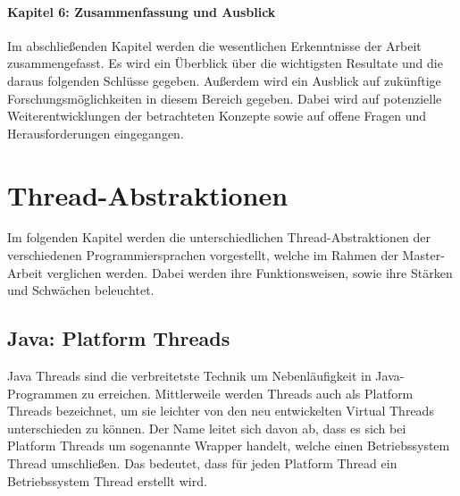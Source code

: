 \documentclass[fontsize=12pt,paper=a4,twoside=semi,parskip=half-,headsepline,headinclude]{scrreprt}
\begin{document}
\subsubsection{Kapitel 6: Zusammenfassung und Ausblick}

Im abschließenden Kapitel werden die wesentlichen Erkenntnisse der Arbeit zusammengefasst. Es wird ein Überblick über die wichtigsten Resultate und die daraus folgenden Schlüsse gegeben. Außerdem wird ein Ausblick auf zukünftige Forschungsmöglichkeiten in diesem Bereich gegeben. Dabei wird auf potenzielle Weiterentwicklungen der betrachteten Konzepte sowie auf offene Fragen und Herausforderungen eingegangen.

\chapter{Thread-Abstraktionen}

Im folgenden Kapitel werden die unterschiedlichen Thread-Abstraktionen der verschiedenen Programmiersprachen vorgestellt, welche im Rahmen der Master-Arbeit verglichen werden. Dabei werden ihre Funktionsweisen, sowie ihre Stärken und Schwächen beleuchtet.

\section{Java: Platform Threads}

Java Threads sind die verbreitetste Technik um Nebenläufigkeit in Java-Programmen zu erreichen. Mittlerweile werden Threads auch als Platform Threads bezeichnet, um sie leichter von den neu entwickelten Virtual Threads unterschieden zu können. Der Name leitet sich davon ab, dass es sich bei Platform Threads um sogenannte Wrapper handelt, welche einen Betriebssystem Thread umschließen. Das bedeutet, dass für jeden Platform Thread ein Betriebssystem Thread erstellt wird.
\end{document}
